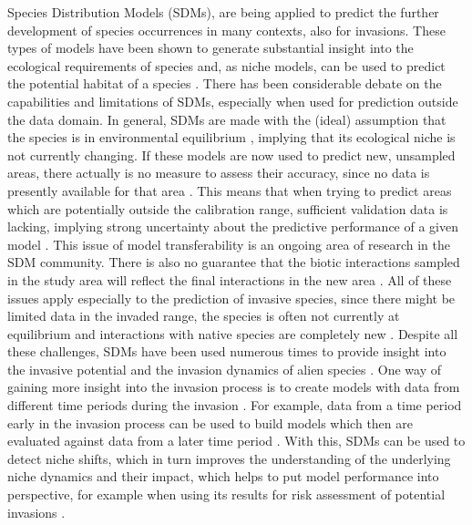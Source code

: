 \documentclass[12pt,a4paper]{article}
\begin{document}
Species Distribution Models (SDMs), are being applied to predict the further development of species occurrences in many contexts, also for invasions.
These types of models have been shown to generate substantial insight into the ecological requirements of species and, as niche models, can be used to predict the potential habitat of a species \autocite{araujo2006sdmchallenges}.
There has been considerable debate on the capabilities and limitations of SDMs, especially when used for prediction outside the data domain.
In general, SDMs are made with the (ideal) assumption that the species is in environmental equilibrium \autocite{elith2009sdmtheory}, implying that its ecological niche is not currently changing.
If these models are now used to predict new, unsampled areas, there actually is no measure to assess their accuracy, since no data is presently available for that area \autocite{araujo2006sdmchallenges}.
This means that when trying to predict areas which are potentially outside the calibration range, sufficient validation data is lacking, implying strong uncertainty about the predictive performance of a given model \autocite{araujo2006sdmchallenges}.
This issue of model transferability is an ongoing area of research in the SDM community.
There is also no guarantee that the biotic interactions sampled in the study area will reflect the final interactions in the new area \autocite{elith2009sdmtheory}.
All of these issues apply especially to the prediction of invasive species, since there might be limited data in the invaded range, the species is often not currently at equilibrium and interactions with native species are completely new \autocite{mainali2015sdmprojecting}.
Despite all these challenges, SDMs have been used numerous times to provide insight into the invasive potential and the invasion dynamics of alien species \autocite{zimmermann2010sdmtrends}.
One way of gaining more insight into the invasion process is to create models with data from different time periods during the invasion \autocite{briscoe2019palmerisdm}.
For example, data from a time period early in the invasion process can be used to build models which then are evaluated against data from a later time period \autocite{barbet2018nigrithoraxsdm}.
With this, SDMs can be used to detect niche shifts, which in turn improves the understanding of the underlying niche dynamics and their impact, which helps to put model performance into perspective, for example when using its results for risk assessment of potential invasions \autocite{pearman2008nicheSDM}.
\end{document}
